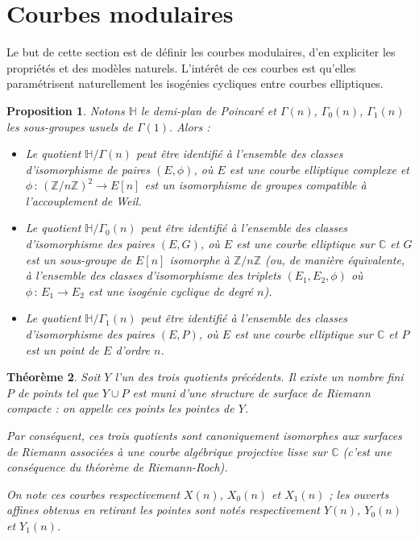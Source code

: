 \documentclass[11pt,a4paper]{article}
\newcommand{\Z}{\mathbb{Z}}
\newcommand{\C}{\mathbb{C}}
\renewcommand{\H}{\mathbb{H}}
\newcommand{\vers}{\rightarrow}
\newcommand{\de}{\,:\,}
\newtheorem{thm}{Théorème}[subsection]
\newtheorem{prop}[thm]{Proposition}
\theoremstyle{definition}
\begin{document}
\newpage

\section{Courbes modulaires}


Le but de cette section est de définir les courbes modulaires, d'en expliciter les propriétés et des modèles naturels. L'intérêt de ces courbes est qu'elles paramétrisent naturellement les isogénies cycliques entre courbes elliptiques.

\begin{prop}

Notons $\H$ le demi-plan de Poincaré et $\Gamma(n)$, $\Gamma_0(n)$, $\Gamma_1(n)$ les sous-groupes usuels de $\Gamma(1).$ Alors :

\begin{itemize}
\item Le quotient $\H/\Gamma(n)$ peut être identifié à l'ensemble des classes d'isomorphisme de paires $(E,\phi)$, où $E$ est une courbe elliptique complexe et $\phi\de (\Z/n\Z)^2\vers E[n]$ est un isomorphisme de groupes compatible à l'accouplement de Weil.
\item Le quotient $\H/\Gamma_0(n)$ peut être identifié à l'ensemble des classes d'isomorphisme des paires $(E,G)$, où $E$ est une courbe elliptique sur $\C$ et $G$ est un sous-groupe de $E[n]$ isomorphe à $\Z/n\Z$ (ou, de manière équivalente, à l'ensemble des classes d'isomorphisme des triplets $(E_1, E_2, \phi)$ où $\phi\de E_1\vers E_2$ est une isogénie cyclique de degré $n$).
\item Le quotient $\H/\Gamma_1(n)$ peut être identifié à l'ensemble des classes d'isomorphisme des paires $(E,P)$, où $E$ est une courbe elliptique sur $\C$ et $P$ est un point de $E$ d'ordre $n$.
\end{itemize}

\end{prop}

\begin{thm}

Soit $Y$ l'un des trois quotients précédents. Il existe un nombre fini $P$ de points tel que $Y\cup P$ est muni d'une structure de surface de Riemann compacte : on appelle ces points les \emph{pointes} de $Y$. 

Par conséquent, ces trois quotients sont canoniquement isomorphes aux surfaces de Riemann associées à une courbe algébrique projective lisse sur $\C$ (c'est une conséquence du théorème de Riemann-Roch).

On note ces courbes respectivement $X(n)$, $X_0(n)$ et $X_1(n)$ ; les ouverts affines obtenus en retirant les pointes sont notés respectivement $Y(n)$, $Y_0(n)$ et $Y_1(n)$.

\end{thm}
\end{document}
